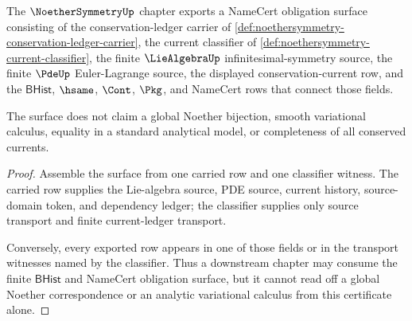 \begin{theorem}
\label{thm:noethersymmetry-namecert-obligation-surface}
The $\NoetherSymmetryUp$ chapter exports a NameCert obligation surface
consisting of the conservation-ledger carrier of
\autoref{def:noethersymmetry-conservation-ledger-carrier}, the current
classifier of \autoref{def:noethersymmetry-current-classifier}, the finite
$\LieAlgebraUp$ infinitesimal-symmetry source, the finite $\PdeUp$
Euler-Lagrange source, the displayed conservation-current row, and the
$\mathsf{BHist}$, $\hsame$, $\Cont$, $\Pkg$, and NameCert rows that connect
those fields.

The surface does not claim a global Noether bijection, smooth variational
calculus, equality in a standard analytical model, or completeness of all
conserved currents.
\end{theorem}
\begin{proof}
Assemble the surface from one carried row and one classifier witness. The
carried row supplies the Lie-algebra source, PDE source, current history,
source-domain token, and dependency ledger; the classifier supplies only
source transport and finite current-ledger transport.

Conversely, every exported row appears in one of those fields or in the
transport witnesses named by the classifier. Thus a downstream chapter may
consume the finite $\mathsf{BHist}$ and NameCert obligation surface, but it
cannot read off a global Noether correspondence or an analytic variational
calculus from this certificate alone.
\end{proof}

